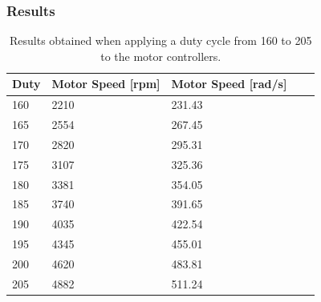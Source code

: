 \subsubsection{Results}
\begin{table}[H]
	\centering
	\begin{tabular}{|l|l|l|l|p{4.3cm}|}
		\hline%
		\textbf{Duty}    & \textbf{Motor Speed [rpm]} & \textbf{Motor Speed [rad/s]} \\ 
		\hline%
		160                & 2210         	   &  231.43                                       \\
		\hline%
		 165      &  2554 						       &  267.45				                \\
		\hline%
         170      &  2820 						       &  295.31				                \\
         \hline%
         175       &  3107                               &  325.36   			                  \\
        \hline%
		 180       &  3381                               &  354.05   			                  \\
		\hline%
		185    & 3740                               &  391.65  			                       \\
		\hline%
		190   &    4035                               &  422.54                                \\
		\hline%
		195   &  4345 						       &  455.01				                   \\
		\hline%
		200 &  4620                               &  483.81    			                    \\
		\hline%
		 205   &    4882                               &  511.24                               \\
		\hline%
	\end{tabular}
	\caption{Results obtained when applying a duty cycle from 160 to 205 to the motor controllers.}
\end{table}

